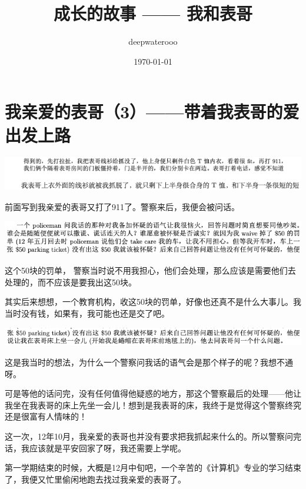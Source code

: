\documentclass[9pt, b5paper]{article}
\author{deepwaterooo}
\date{\today}
\title{成长的故事 —— 我和表哥}
\begin{document}
\maketitle
\tableofcontents


\section{我亲爱的表哥（3）——带着我表哥的爱出发上路}
\label{sec:orgd2b08e2}

\begin{center}
\includegraphics[width=.9\linewidth]{./pic/backups_plans_20210506_094808.png}
\end{center}

前面写到我亲爱的表哥又打了911了。警察来后，我便会被问话。

\begin{center}
\includegraphics[width=.9\linewidth]{./pic/backups_plans_20210505_203728.png}
\end{center}

这个50块的罚单， 警察当时说不用我担心，他们会处理，那么应该是需要他们去处理的，而不应该是要我出这50块。

其实后来想想，一个教育机构，收这50块的罚单，好像也还真不是什么大事儿。我当时没有钱，如果有，我可能也还是交了吧。 

\begin{center}
\includegraphics[width=.9\linewidth]{./pic/backups_plans_20210505_203929.png}
\end{center}

这是我当时的想法，为什么一个警察问我话的语气会是那个样子的呢？我想不通呀。 

可是等他的话问完，没有任何值得他疑惑的地方，那这个警察最后的处理——他让我坐在我表哥的床上先坐一会儿！想到是我表哥的床，我终于是觉得这个警察终究还是很富有人情味的！

这一次，12年10月，我亲爱的表哥也并没有要求把我抓起来什么的。所以警察问完话，我应该就是平安回家了呀，我还需要上学呢。 

第一学期结束的时候，大概是12月中旬吧，一个辛苦的《计算机》专业的学习结束了，我便又忙里偷闲地跑去找过我亲爱的表哥了。 
\end{document}
